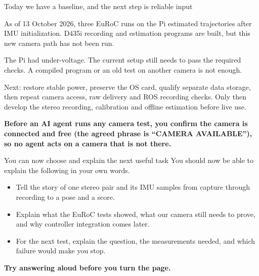\documentclass[aspectratio=169,12pt,t]{beamer}
\newcommand{\para}[1]{#1\par\medskip}
\newcommand{\lesson}[1]{\vfill{\color{teal!70!black}\bfseries #1}\par}
\begin{document}
\begin{frame}{Today we have a baseline, and the next step is reliable input}

\para{As of 13 October 2026, three EuRoC runs on the Pi estimated trajectories after IMU initialization. D435i recording and estimation programs are built, but this new camera path has not been run.}
\para{The Pi had under-voltage. The current setup still needs to pass the required checks. A compiled program or an old test on another camera is not enough.}
\para{Next: restore stable power, preserve the OS card, qualify separate data storage, then repeat camera access, raw delivery and ROS recording checks. Only then develop the stereo recording, calibration and offline estimation before live use.}
\lesson{Before an AI agent runs any camera test, you confirm the camera is connected and free (the agreed phrase is ``CAMERA AVAILABLE''), so no agent acts on a camera that is not there.}

\end{frame}

\begin{frame}{You can now choose and explain the next useful task}
\para{You should now be able to explain the following in your own words.}
\begin{itemize}
\item Tell the story of one stereo pair and its IMU samples from capture through recording to a pose and a score.
\item Explain what the EuRoC tests showed, what our camera still needs to prove, and why controller integration comes later.
\item For the next test, explain the question, the measurements needed, and which failure would make you stop.
\end{itemize}
\lesson{Try answering aloud before you turn the page.}
\end{frame}
\end{document}
